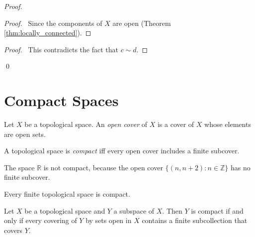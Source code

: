 \begin{proof}
\pf
{}
\begin{proof}
	\pf\ Since the components of $X$ are open (Theorem \ref{thm:locally_connected}).
\end{proof}
\qedstep
\begin{proof}
	\pf\ This contradicts the fact that $c \sim d$.
\end{proof}
\qed
\end{proof}

\section{Compact Spaces}

\begin{df}
Let $X$ be a topological space. An \emph{open cover} of $X$ is a cover of $X$ whose elements are open sets.
\end{df}

\begin{df}[Compact]
A topological space is \emph{compact} iff every open cover includes a finite subcover.
\end{df}

\begin{ex}
The space $\mathbb{R}$ is not compact, because the open cover $\{ (n, n+2) : n \in \mathbb{Z} \}$ has no finite subcover.
\end{ex}

\begin{ex}
Every finite topological space is compact.
\end{ex}

\begin{lm}
\label{lm:subspace_compact}
Let $X$ be a topological space and $Y$ a subspace of $X$. Then $Y$ is compact if and only if every covering of $Y$ by sets open in $X$ contains a finite subcollection that covers $Y$.
\end{lm}

